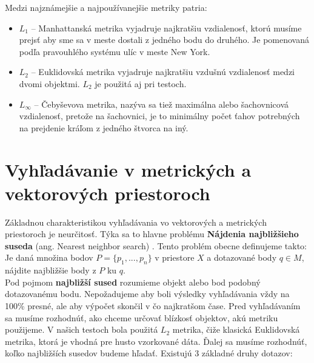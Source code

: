 \documentclass[12pt,a4paper,oneside]{fithesis2}
\begin{document}
Medzi najznámejšie a najpoužívanejšie metriky patria:
\begin{itemize}
\item $L_1$ -- Manhattanská metrika vyjadruje najkratšiu vzdialenosť, ktorú musíme prejsť aby sme sa v meste dostali z jedného bodu do druhého. Je pomenovaná podľa pravouhlého systému ulíc v meste New York.
\item $L_2$ -- Euklidovská metrika vyjadruje najkratšiu vzdušnú vzdialenosť medzi dvomi objektmi. $L_2$ je použitá aj pri testoch.
\item $L_\infty $ -- Čebyševova metrika, nazýva sa tiež maximálna alebo šachovnicová vzdialenosť, pretože na šachovnici, je to minimálny počet ťahov potrebných na prejdenie kráľom z jedného štvorca na iný.
\end{itemize}
   \section{Vyhľadávanie v metrických a vektorových priestoroch}
   Základnou charakteristikou vyhľadávania vo vektorových a metrických priestoroch je neurčitosť. Týka sa to hlavne problému \textbf{Nájdenia najbližšieho suseda} (ang. Nearest neighbor search) \cite{nns2009}. Tento problém obecne definujeme takto: \\
   Je daná množina bodov $P=\{p_1,...,p_n\}$ v priestore $X$ a dotazované body $q \in M$, nájdite najbližšie body z $P$ ku $q$.\\
   Pod pojmom \textbf{najbližší sused} rozumieme objekt alebo bod podobný dotazovanému bodu. Nepožadujeme aby boli výsledky vyhľadávania vždy na 100\% presné, ale aby výpočet skončil v čo najkratšom čase.
   Pred vyhľadávaním sa musíme rozhodnúť, ako chceme určovať blízkosť objektov, akú metriku použijeme. V našich testoch bola použitá $L_2$ metrika, čiže klasická Euklidovská metrika, ktorá je vhodná pre husto vzorkované dáta. Ďalej sa musíme rozhodnúť, koľko najbližších susedov budeme hľadať. Existujú 3 základné druhy dotazov:
\end{document}
